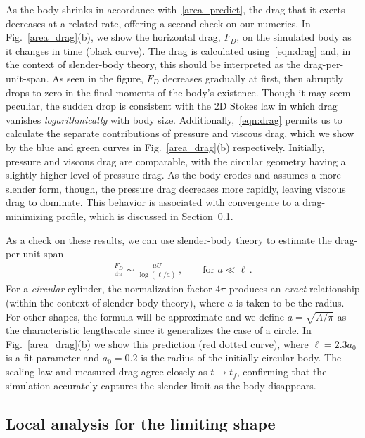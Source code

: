 \documentclass[preprint, 10pt]{elsarticle}
\begin{document}
	As the body shrinks in accordance with~\eqref{area_predict}, the drag that it exerts decreases at a related rate, offering a second check on our numerics. In Fig.~\ref{area_drag}(b), we show the horizontal drag, $F_D$, on the simulated body as it changes in time (black curve). The drag is calculated using~\eqref{eqn:drag} and, in the context of slender-body theory, this should be interpreted as the drag-per-unit-span. As seen in the figure, $F_D$ decreases gradually at first, then abruptly drops to zero in the final moments of the body's existence. Though it may seem peculiar, the sudden drop is consistent with the 2D Stokes law in which drag vanishes {\em logarithmically} with body size. Additionally,~\eqref{eqn:drag} permits us to calculate the separate contributions of pressure and viscous drag, which we show by the blue and green curves in Fig.~\ref{area_drag}(b) respectively. Initially, pressure and viscous drag are comparable, with the circular geometry having a slightly higher level of pressure drag. As the body erodes and assumes a more slender form, though, the pressure drag decreases more rapidly, leaving viscous drag to dominate. This behavior is associated with convergence to a drag-minimizing profile, which is discussed in Section~\ref{LimitingShape}.

As a check on these results, we can use slender-body theory to estimate the drag-per-unit-span
\begin{align}
\label{dragscaling}
\frac{F_D}{4 \pi} \sim \frac{ \mu U}{\log(\ell/a)}\, ,	\qquad \text{for } a \ll \ell \, .
\end{align}
For a {\em circular} cylinder, the normalization factor $4 \pi$ produces an {\em exact} relationship (within the context of slender-body theory), where $a$ is taken to be the radius. For other shapes, the formula will be approximate and we define $a = \sqrt{A/\pi}$ as the characteristic lengthscale since it generalizes the case of a circle. In Fig.~\ref{area_drag}(b) we show this prediction (red dotted curve), where $\ell = 2.3 a_0$ is a fit parameter and $a_0 = 0.2$ is the radius of the initially circular body. The scaling law and measured drag agree closely as $t \to t_f$, confirming that the simulation accurately captures the slender limit as the body disappears.


\subsection{Local analysis for the limiting shape}
\label{LimitingShape}
 
\end{document}
